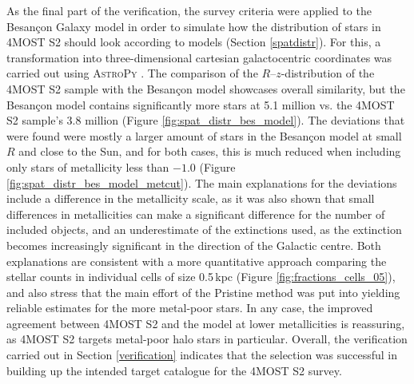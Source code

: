 \documentclass[a4paper,11pt]{article}
\begin{document}
%
As the final part of the verification, the survey criteria were applied to the Besan\c{c}on Galaxy model \citep{besancon1,besancon2} in order to simulate how the distribution of stars in 4MOST S2 should look according to models (Section \ref{spatdistr}). For this, a transformation into three-dimensional cartesian galactocentric coordinates was carried out using \textsc{AstroPy} \citep{astropy1}. The comparison of the $R$--$z$-distribution of the 4MOST S2 sample with the Besan\c{c}on model showcases overall similarity, but the Besan\c{c}on model contains significantly more stars at 5.1 million vs. the 4MOST S2 sample's 3.8 million (Figure \ref{fig:spat_distr_bes_model}). The deviations that were found were mostly a larger amount of stars in the Besan\c{c}on model at small $R$ and close to the Sun, and for both cases, this is much reduced when including only stars of metallicity less than $-1.0$ (Figure \ref{fig:spat_distr_bes_model_metcut}). The main explanations for the deviations include a difference in the metallicity scale, as it was also shown that small differences in metallicities can make a significant difference for the number of included objects, and an underestimate of the extinctions used, as the extinction becomes increasingly significant in the direction of the Galactic centre. Both explanations are consistent with a more quantitative approach comparing the stellar counts in individual cells of size 0.5\,kpc (Figure \ref{fig:fractions_cells_05}), and \citet{pristinegaia} also stress that the main effort of the Pristine method was put into yielding reliable estimates for the more metal-poor stars. In any case, the improved agreement between 4MOST S2 and the model at lower metallicities is reassuring, as 4MOST S2 targets metal-poor halo stars in particular. Overall, the verification carried out in Section \ref{verification} indicates that the selection was successful in building up the intended target catalogue for the 4MOST S2 survey.\\ \\
%
\end{document}
